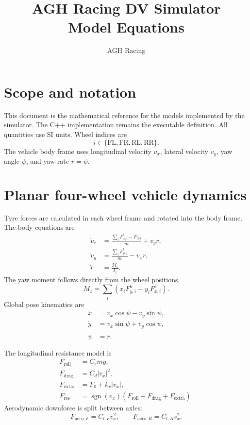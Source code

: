 \documentclass[11pt,a4paper]{article}
\title{AGH Racing DV Simulator\\Model Equations}
\author{AGH Racing}
\date{}
\newcommand{\sgn}{\operatorname{sgn}}
\begin{document}
\maketitle
\tableofcontents

\section{Scope and notation}

This document is the mathematical reference for the models implemented by the
simulator. The C++ implementation remains the executable definition. All
quantities use SI units. Wheel indices are
\[
  i\in\{\mathrm{FL},\mathrm{FR},\mathrm{RL},\mathrm{RR}\}.
\]
The vehicle body frame uses longitudinal velocity \(v_x\), lateral velocity
\(v_y\), yaw angle \(\psi\), and yaw rate \(r=\dot{\psi}\).

\section{Planar four-wheel vehicle dynamics}

Tyre forces are calculated in each wheel frame and rotated into the body frame.
The body equations are
\begin{align}
  \dot v_x &= \frac{\sum_i F_{x,i}^{b}-F_{\mathrm{res}}}{m}+v_y r,\\
  \dot v_y &= \frac{\sum_i F_{y,i}^{b}}{m}-v_x r,\\
  \dot r   &= \frac{M_z}{I_z}.
\end{align}
The yaw moment follows directly from the wheel positions
\begin{equation}
  M_z=\sum_i\left(x_iF_{y,i}^{b}-y_iF_{x,i}^{b}\right).
\end{equation}
Global pose kinematics are
\begin{align}
  \dot x &= v_x\cos\psi-v_y\sin\psi,\\
  \dot y &= v_x\sin\psi+v_y\cos\psi,\\
  \dot\psi &= r.
\end{align}

The longitudinal resistance model is
\begin{align}
  F_{\mathrm{roll}} &= C_rmg,\\
  F_{\mathrm{drag}} &= C_d|v_x|^2,\\
  F_{\mathrm{extra}} &= F_0+k_v|v_x|,\\
  F_{\mathrm{res}} &=
  \sgn(v_x)\left(F_{\mathrm{roll}}+F_{\mathrm{drag}}+
  F_{\mathrm{extra}}\right).
\end{align}
Aerodynamic downforce is split between axles:
\begin{equation}
  F_{\mathrm{aero},F}=C_{l,F}v_x^2,\qquad
  F_{\mathrm{aero},R}=C_{l,R}v_x^2.
\end{equation}
\end{document}
